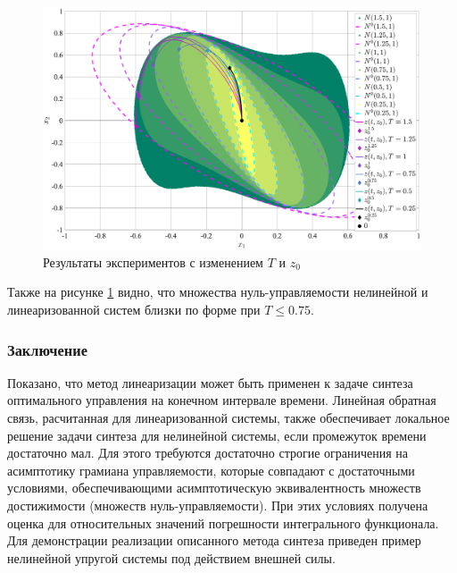 \documentclass[../main.tex]{subfiles}
\begin{document}
\begin{figure}
    \centering
    \includegraphics[width=\linewidth]{images/GusevMIOsipov_Duffing_variable_z0.eps}
    \caption{Результаты экспериментов с изменением $T$ и $z_0$}
    \label{fig:series2}
\end{figure}

Также на рисунке \ref{fig:series2} видно, что множества нуль-управляемости нелинейной и линеаризованной систем близки по форме при $ T \leqslant 0.75$. 

\subsubsection{Заключение}
Показано, что метод линеаризации может быть применен к задаче синтеза оптимального управления на конечном интервале времени. 
Линейная обратная связь, расчитанная для линеаризованной системы, также обеспечивает локальное решение задачи синтеза для нелинейной системы, если промежуток времени достаточно мал.   
Для этого требуются достаточно строгие ограничения на асимптотику грамиана управляемости, которые совпадают с достаточными условиями, обеспечивающими асимптотическую эквивалентность множеств достижимости (множеств нуль-управляемости). 
При этих условиях получена оценка для относительных значений погрешности интегрального функционала. 
Для демонстрации реализации описанного метода синтеза приведен пример нелинейной упругой системы под действием внешней силы. 
\end{document}

